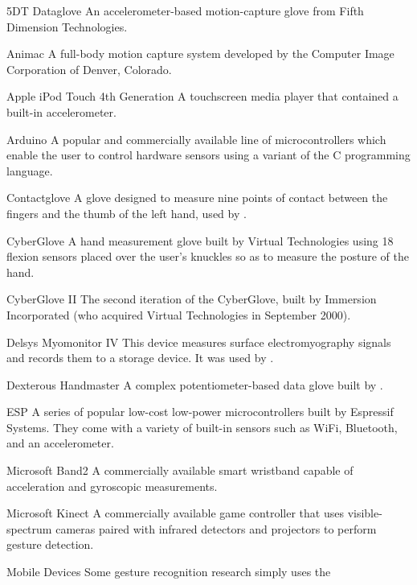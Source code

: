 \begin{Nomencl}[1cm]
    \item[5DT Dataglove] An accelerometer-based motion-capture glove from Fifth Dimension Technologies.
    \item[Animac] A full-body motion capture system developed by the Computer
        Image Corporation of Denver, Colorado.
    \item[Apple iPod Touch 4th Generation] A touchscreen media player that contained a built-in accelerometer.
    \item[Arduino] A popular and commercially available line of
        microcontrollers which enable the user to control hardware sensors
        using a variant of the C programming language.
    \item[Contactglove] A glove designed to measure nine points of contact
        between the fingers and the thumb of the left hand, used by
        \cite{felsGloveTalkIIaNeuralnetworkInterface1998}.
    \item[CyberGlove] A hand measurement glove built by Virtual Technologies
        using 18 flexion sensors placed over the user's knuckles so as to
        measure the posture of the hand.
    \item[CyberGlove II] The second iteration of the CyberGlove, built by
        Immersion Incorporated (who acquired Virtual Technologies in September
        2000).
    \item[Delsys Myomonitor IV] This device measures surface electromyography
        signals and records them to a storage device. It was used by
        \cite{zhangHandGestureRecognition2009}.
    \item[Dexterous Handmaster] A complex potentiometer-based data glove built
        by \cite{jacobsenUTAHDextrousHand1984}.
    \item[ESP] A series of popular low-cost low-power microcontrollers built by
        Espressif Systems. They come with a variety of built-in sensors such as
        WiFi, Bluetooth, and an accelerometer.
    \item[Microsoft Band2] A commercially available smart wristband capable of
        acceleration and gyroscopic measurements.
    \item[Microsoft Kinect] A commercially available game controller that
        uses visible-spectrum cameras paired with infrared detectors
        and projectors to perform gesture detection.
    \item[Mobile Devices] Some gesture recognition research simply uses the

\end{Nomencl}
